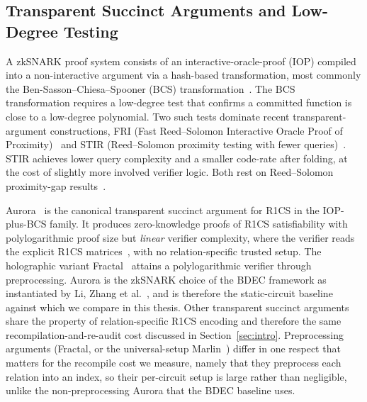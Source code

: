 \subsection{Transparent Succinct Arguments and Low-Degree Testing}
A zkSNARK proof system consists of an interactive-oracle-proof (IOP) compiled into a non-interactive argument via a hash-based transformation, most commonly the Ben-Sasson--Chiesa--Spooner (BCS) transformation~\cite{bensasson2016iop}.
The BCS transformation requires a low-degree test that confirms a committed function is close to a low-degree polynomial. Two such tests dominate recent transparent-argument constructions, FRI (Fast Reed--Solomon Interactive Oracle Proof of Proximity)~\cite{bensasson2018fri} and STIR (Reed--Solomon proximity testing with fewer queries)~\cite{cryptoeprint:2024/390}. STIR achieves lower query complexity and a smaller code-rate after folding, at the cost of slightly more involved verifier logic. Both rest on Reed--Solomon proximity-gap results~\cite{cryptoeprint:2020/654}.

Aurora~\cite{cryptoeprint:2018/828} is the canonical transparent succinct argument for R1CS in the IOP-plus-BCS family. It produces zero-knowledge proofs of R1CS satisfiability with polylogarithmic proof size but \emph{linear} verifier complexity, where the verifier reads the explicit R1CS matrices~\cite[Thm.~1.2]{cryptoeprint:2018/828}, with no relation-specific trusted setup.
 The holographic variant Fractal~\cite{cryptoeprint:2019/1076} attains a polylogarithmic verifier through preprocessing. Aurora is the zkSNARK choice of the BDEC framework as instantiated by Li, Zhang et al.~\cite{10.1007/978-981-96-0957-4_3}, and is therefore the static-circuit baseline against which we compare in this thesis. Other transparent succinct arguments share the property of relation-specific R1CS encoding and therefore the same recompilation-and-re-audit cost discussed in Section~\ref{sec:intro}. Preprocessing arguments (Fractal, or the universal-setup Marlin~\cite{chiesa2020marlin}) differ in one respect that matters for the recompile cost we measure, namely that they preprocess each relation into an index, so their per-circuit setup is large rather than negligible, unlike the non-preprocessing Aurora that the BDEC baseline uses.

